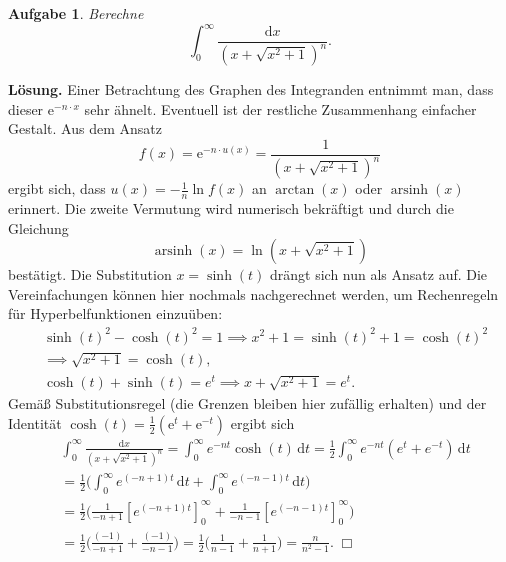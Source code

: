 \documentclass[a4paper,10pt,fleqn,twoside]{scrartcl}
\numberwithin{equation}{section}
\newcommand{\ee}{\mathrm e}
\newcommand{\strong}[1]{{\normalfont\sffamily\bfseries #1}}
\theoremstyle{Aufgabe}
\newtheorem{Aufgabe}{\sffamily Aufgabe}[section]
\begin{document}
\begin{Aufgabe}
Berechne
\[\int_0^\infty \frac{\mathrm dx}{(x+\sqrt{x^2+1})^n}.\]
\end{Aufgabe}
\strong{Lösung.} Einer Betrachtung des Graphen des Integranden
entnimmt man, dass dieser $\ee^{-n\cdot x}$ sehr ähnelt.
Eventuell ist der restliche Zusammenhang einfacher Gestalt.
Aus dem Ansatz
\begin{equation}
f(x) = \ee^{-n\cdot u(x)} = \frac{1}{(x+\sqrt{x^2+1})^n}
\end{equation}
ergibt sich, dass $u(x) = -\tfrac{1}{n}\ln f(x)$ an $\arctan(x)$
oder $\operatorname{arsinh}(x)$ erinnert. Die zweite Vermutung
wird numerisch bekräftigt und durch die Gleichung
\begin{equation}
\operatorname{arsinh}(x) = \ln(x+\sqrt{x^2+1})
\end{equation}
bestätigt. Die Substitution $x=\sinh(t)$ drängt sich nun als Ansatz auf.
Die Vereinfachungen können hier nochmals nachgerechnet werden,
um Rechenregeln für Hyperbelfunktionen einzuüben:
\begin{align}
&\sinh(t)^2-\cosh(t)^2 = 1 \implies x^2+1 = \sinh(t)^2+1 = \cosh(t)^2\\
&\implies \sqrt{x^2+1} = \cosh(t),\\
& \cosh(t)+\sinh(t) = e^t \implies x+\sqrt{x^2+1} = e^t.
\end{align}
Gemäß Substitutionsregel (die Grenzen bleiben hier zufällig erhalten)
und der Identität $\cosh(t) = \tfrac{1}{2}(\ee^t+\ee^{-t})$ ergibt sich
\begin{align}
&\int_0^\infty \frac{\mathrm dx}{(x+\sqrt{x^2+1})^n}
= \int_0^\infty e^{-nt} \cosh(t) \,\mathrm dt
= \frac{1}{2}\int_0^\infty e^{-nt}(e^t+e^{-t})\,\mathrm dt\\
&= \frac{1}{2}\bigg(\int_0^\infty e^{(-n+1)t}\,\mathrm dt
+\int_0^\infty e^{(-n-1)t}\,\mathrm dt\bigg)\\
&= \frac{1}{2}\bigg(\frac{1}{-n+1}[e^{(-n+1)t}]_0^\infty
+ \frac{1}{-n-1}[e^{(-n-1)t}]_0^\infty\bigg)\\
&= \frac{1}{2}\bigg(\frac{(-1)}{-n+1}
+ \frac{(-1)}{-n-1}\bigg)
= \frac{1}{2}\bigg(\frac{1}{n-1}
+ \frac{1}{n+1}\bigg)
= \frac{n}{n^2-1}.\;\Box
\end{align}
\end{document}
